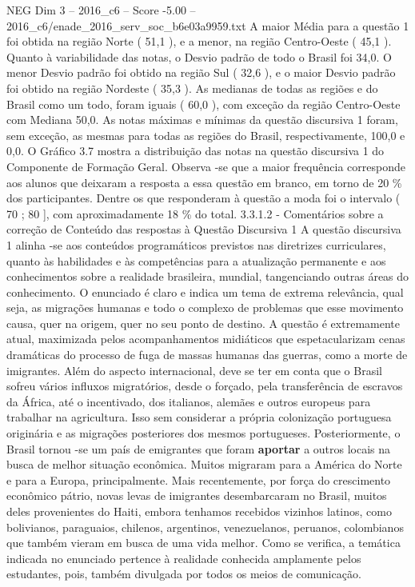 \begin{textsample}{NEG Dim 3 – 2016\_c6 – Score -5.00 – 2016\_c6/enade\_2016\_serv\_soc\_b6e03a9959.txt}
A maior Média para a questão 1 foi obtida na região Norte ( 51,1 ), e a menor, na região Centro-Oeste ( 45,1 ).
Quanto à variabilidade das notas, o Desvio padrão de todo o Brasil foi 34,0.
O menor Desvio padrão foi obtido na região Sul ( 32,6 ), e o maior Desvio padrão foi obtido na região Nordeste ( 35,3 ).
As medianas de todas as regiões e do Brasil como um todo, foram iguais ( 60,0 ), com exceção da região Centro-Oeste com Mediana 50,0.
As notas máximas e mínimas da questão discursiva 1 foram, sem exceção, as mesmas para todas as regiões do Brasil, respectivamente, 100,0 e 0,0.
O Gráfico 3.7 mostra a distribuição das notas na questão discursiva 1 do Componente de Formação Geral.
Observa -se que a maior frequência corresponde aos alunos que deixaram a resposta a essa questão em branco, em torno de 20 \% dos participantes.
Dentre os que responderam à questão a moda foi o intervalo ( 70 ; 80 ], com aproximadamente 18 \% do total. 3.3.1.2 - Comentários sobre a correção de Conteúdo das respostas à Questão Discursiva 1 A questão discursiva 1 alinha -se aos conteúdos programáticos previstos nas diretrizes curriculares, quanto às habilidades e às competências para a atualização permanente e aos conhecimentos sobre a realidade brasileira, mundial, tangenciando outras áreas do conhecimento.
O enunciado é claro e indica um tema de extrema relevância, qual seja, as migrações humanas e todo o complexo de problemas que esse movimento causa, quer na origem, quer no seu ponto de destino.
A questão é extremamente atual, maximizada pelos acompanhamentos midiáticos que espetacularizam cenas dramáticas do processo de fuga de massas humanas das guerras, como a morte de imigrantes.
Além do aspecto internacional, deve se ter em conta que o Brasil sofreu vários influxos migratórios, desde o forçado, pela transferência de escravos da África, até o incentivado, dos italianos, alemães e outros europeus para trabalhar na agricultura.
Isso sem considerar a própria colonização portuguesa originária e as migrações posteriores dos mesmos portugueses.
Posteriormente, o Brasil tornou -se um país de emigrantes que foram \textbf{aportar} a outros locais na busca de melhor situação econômica.
Muitos migraram para a América do Norte e para a Europa, principalmente.
Mais recentemente, por força do crescimento econômico pátrio, novas levas de imigrantes desembarcaram no Brasil, muitos deles provenientes do Haiti, embora tenhamos recebidos vizinhos latinos, como bolivianos, paraguaios, chilenos, argentinos, venezuelanos, peruanos, colombianos que também vieram em busca de uma vida melhor.
Como se verifica, a temática indicada no enunciado pertence à realidade conhecida amplamente pelos estudantes, pois, também divulgada por todos os meios de comunicação.

\end{textsample}
